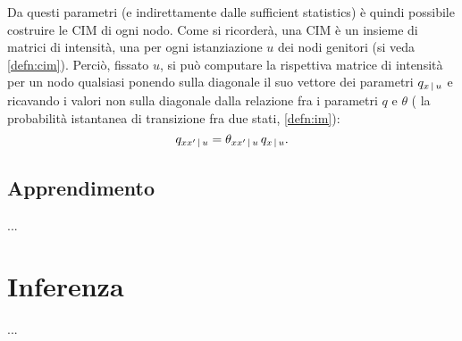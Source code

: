 Da questi parametri (e indirettamente dalle sufficient statistics) è quindi possibile costruire le \acl{CIM} di ogni nodo. Come si ricorderà, una \acs{CIM} è un insieme di matrici di intensità, una per ogni istanziazione $u$ dei nodi genitori (si veda \ref{defn:cim}). Perciò, fissato $u$, si può computare la rispettiva matrice di intensità per un nodo qualsiasi ponendo sulla diagonale il suo vettore dei parametri $q_{x\,\arrowvert\,u}$ e ricavando i valori non sulla diagonale dalla relazione fra i parametri $q$ e $\theta$ (\ie{} la probabilità istantanea di transizione fra due stati, \ref{defn:im}):
\[
q_{xx^\prime\,\arrowvert\,u}=\theta_{xx^\prime\,\arrowvert\,u}\,q_{x\,\arrowvert\,u}\text{.}
\]

\subsection{Apprendimento}
\label{sec:ctbn-learning}
...

\section{Inferenza}
\label{sec:ctbn-inferenza}
...









